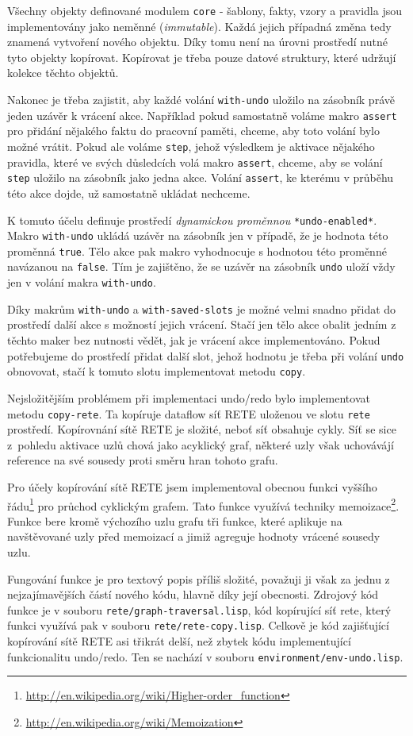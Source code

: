 Všechny objekty definované modulem \verb|core| - šablony, fakty, vzory a
pravidla jsou implementovány jako neměnné (\emph{immutable}). Každá jejich
případná změna tedy znamená vytvoření nového objektu. Díky tomu není na úrovni
prostředí nutné tyto objekty kopírovat. Kopírovat je třeba pouze datové
struktury, které udržují kolekce těchto objektů.

Nakonec je třeba zajistit, aby každé volání \verb|with-undo| uložilo na zásobník
právě jeden uzávěr k vrácení akce. Například pokud samostatně voláme makro
\verb|assert| pro přidání nějakého faktu do pracovní paměti, chceme, aby toto volání
bylo možné vrátit. Pokud ale voláme \verb|step|, jehož výsledkem je aktivace
nějakého pravidla, které ve svých důsledcích volá makro \verb|assert|, chceme,
aby se volání \verb|step| uložilo na zásobník jako jedna akce. Volání
\verb|assert|, ke kterému v průběhu této akce dojde, už samostatně ukládat
nechceme.

K tomuto účelu definuje prostředí \emph{dynamickou proměnnou}
\verb|*undo-enabled*|.  Makro \verb|with-undo| ukládá uzávěr na zásobník jen v
případě, že je hodnota této proměnná \verb|true|. Tělo akce pak makro
vyhodnocuje s hodnotou této proměnné navázanou na \verb|false|. Tím je
zajištěno, že se uzávěr na zásobník \verb|undo| uloží vždy jen v
 volání makra \verb|with-undo|.

Díky makrům \verb|with-undo| a \verb|with-saved-slots| je možné velmi snadno
přidat do prostředí další akce s možností jejich vrácení. Stačí jen tělo akce
obalit jedním z těchto maker bez nutnosti vědět, jak je vrácení akce
implementováno. Pokud potřebujeme do prostředí přidat další slot, jehož hodnotu
je třeba při volání \verb|undo| obnovovat, stačí k tomuto slotu implementovat
metodu \verb|copy|.

Nejsložitějším problémem při implementaci undo/redo bylo implementovat metodu
\verb|copy-rete|. Ta kopíruje dataflow síť RETE uloženou ve slotu \verb|rete|
prostředí. Kopírovnání sítě RETE je složité, neboť síť obsahuje cykly. Síť se
sice z~pohledu aktivace uzlů chová jako acyklický graf, některé uzly však
uchovávájí reference na své sousedy proti směru hran tohoto grafu.

Pro účely kopírování sítě RETE jsem implementoval obecnou funkci vyššího
řádu\footnote{\url{http://en.wikipedia.org/wiki/Higher-order\_function}}
pro průchod cyklickým grafem. Tato funkce využívá techniky
memoizace\footnote{\url{http://en.wikipedia.org/wiki/Memoization}}. Funkce bere
kromě výchozího uzlu grafu tři funkce, které aplikuje na navštěvované uzly před
memoizací a jimiž agreguje hodnoty vrácené sousedy uzlu.

Fungování funkce je pro textový popis příliš složité, považuji ji však za jednu
z nejzajímavějších částí nového kódu, hlavně díky její obecnosti. Zdrojový kód
funkce je v souboru \verb|rete/graph-traversal.lisp|, kód kopírující síť rete,
který funkci využívá pak v souboru \verb|rete/rete-copy.lisp|. Celkově je kód
zajišťující kopírování sítě RETE asi třikrát delší, než zbytek kódu
implementující funkcionalitu undo/redo. Ten se nachází v souboru
\verb|environment/env-undo.lisp|.
